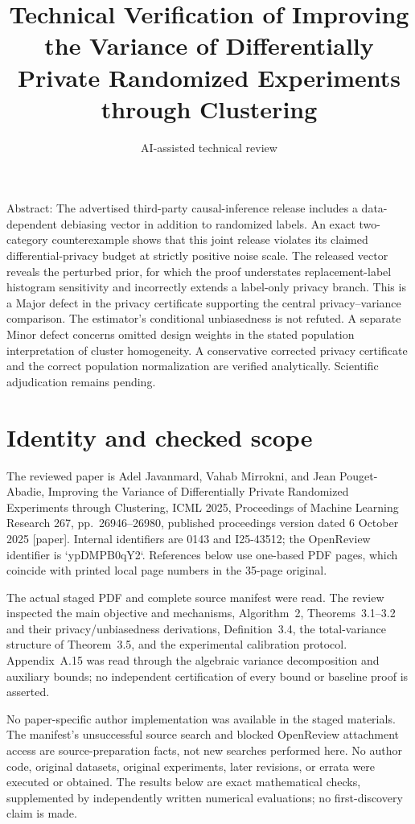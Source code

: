 \documentclass[10pt]{article}
\title{Technical Verification of
Improving the Variance of Differentially Private Randomized Experiments through Clustering}
\author{AI-assisted technical review}
\date{}
\begin{document}
\maketitle
Abstract: The advertised third-party causal-inference release includes a data-dependent debiasing vector in addition to randomized labels. An exact two-category counterexample shows that this joint release violates its claimed differential-privacy budget at strictly positive noise scale. The released vector reveals the perturbed prior, for which the proof understates replacement-label histogram sensitivity and incorrectly extends a label-only privacy branch. This is a Major defect in the privacy certificate supporting the central privacy–variance comparison. The estimator’s conditional unbiasedness is not refuted. A separate Minor defect concerns omitted design weights in the stated population interpretation of cluster homogeneity. A conservative corrected privacy certificate and the correct population normalization are verified analytically. Scientific adjudication remains pending.\par
\section*{Identity and checked scope}
The reviewed paper is Adel Javanmard, Vahab Mirrokni, and Jean Pouget-Abadie, Improving the Variance of Differentially Private Randomized Experiments through Clustering, ICML 2025, Proceedings of Machine Learning Research 267, pp. 26946–26980, published proceedings version dated 6 October 2025 [paper]. Internal identifiers are 0143 and I25-43512; the OpenReview identifier is `ypDMPB0qY2`. References below use one-based PDF pages, which coincide with printed local page numbers in the 35-page original.\par
The actual staged PDF and complete source manifest were read. The review inspected the main objective and mechanisms, Algorithm 2, Theorems 3.1–3.2 and their privacy/unbiasedness derivations, Definition 3.4, the total-variance structure of Theorem 3.5, and the experimental calibration protocol. Appendix A.15 was read through the algebraic variance decomposition and auxiliary bounds; no independent certification of every bound or baseline proof is asserted.\par
No paper-specific author implementation was available in the staged materials. The manifest’s unsuccessful source search and blocked OpenReview attachment access are source-preparation facts, not new searches performed here. No author code, original datasets, original experiments, later revisions, or errata were executed or obtained. The results below are exact mathematical checks, supplemented by independently written numerical evaluations; no first-discovery claim is made.\par
\end{document}
